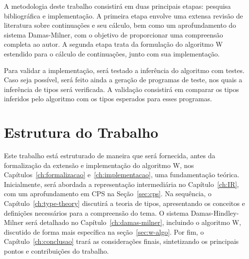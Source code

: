 A metodologia deste trabalho consistirá em duas principais etapas: pesquisa bibliográfica e implementação.
A primeira etapa envolve uma extensa revisão de literatura sobre continuações e seu cálculo, bem como um aprofundamento do sistema Damas-Milner, com o objetivo de proporcionar uma compreensão completa ao autor.
A segunda etapa trata da formulação do algoritmo W estendido para o cálculo de continuações, junto com sua implementação.

Para validar a implementação, será testado a inferência do algoritmo com testes.
Caso seja possível, será feito ainda a geração de programas de teste, nos quais a inferência de tipos será verificada.
A validação consistirá em comparar os tipos inferidos pelo algoritmo com os tipos esperados para esses programas.

\section{Estrutura do Trabalho}\label{sec:estrutura-trabalho}

Este trabalho está estruturado de maneira que será fornecida, antes da formalização da extensão e implementação do algoritmo W, nos Capítulos~\ref{ch:formalizacao} e~\ref{ch:implementacao}, uma fundamentação teórica.
Inicialmente, será abordada a representação intermediária no Capítulo~\ref{ch:IR}, com um aprofundamento em CPS na Seção~\ref{sec:cps}.
Na sequência, o Capítulo~\ref{ch:type-theory} discutirá a teoria de tipos, apresentando os conceitos e definições necessários para a compreensão do tema.
O sistema Damas-Hindley-Milner será detalhado no Capítulo~\ref{ch:damas-milner}, incluindo o algoritmo W, discutido de forma mais específica na seção~\ref{sec:w-algo}.
Por fim, o Capítulo~\ref{ch:conclusao} trará as considerações finais, sintetizando os principais pontos e contribuições do trabalho.
